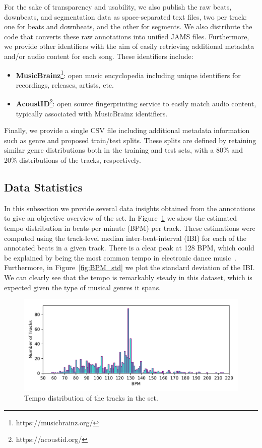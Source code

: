 \documentclass{article}
\begin{document}
For the sake of transparency and usability, we also publish the raw beats, downbeats, and segmentation data as space-separated text files, two per track: one for beats and downbeats, and the other for segments.
We also distribute the code that converts these raw annotations into unified JAMS files.
Furthermore, we provide other identifiers with the aim of easily retrieving additional metadata and/or audio content for each song.
These identifiers include:

\begin{itemize}
    \item \textbf{MusicBrainz}\footnote{https://musicbrainz.org/}: open music encyclopedia including unique identifiers for recordings, releases, artists, etc. 
    \item \textbf{AcoustID}\footnote{https://acoustid.org/}: open source fingerprinting service to easily match audio content, typically associated with MusicBrainz identifiers.
\end{itemize}

Finally, we provide a single CSV file including additional metadata information such as genre and proposed train/test splits.
These splits are defined by retaining similar genre distributions both in the training and test sets, with a 80\% and 20\% distributions of the tracks, respectively.

\subsection{Data Statistics}

In this subsection we provide several data insights obtained from the annotations to give an objective overview of the set.
In Figure~\ref{fig:BPM_dist} we show the estimated tempo distribution in beats-per-minute (BPM) per track.
These estimations were computed using the track-level median inter-beat-interval (IBI) for each of the annotated beats in a given track.
There is a clear peak at 128 BPM, which could be explained by being the most common tempo in electronic dance music~\cite{Moelants2008}.
Furthermore, in Figure~\ref{fig:BPM_std} we plot the standard deviation of the IBI.
We can clearly see that the tempo is remarkably steady in this dataset, which is expected given the type of musical genres it spans.

\begin{figure}
    \centerline{\includegraphics[width=1.05\columnwidth]{figs/BPM_distribution.pdf}}
    \caption{Tempo distribution of the tracks in the set.}
    \label{fig:BPM_dist}
\end{figure}
\end{document}
